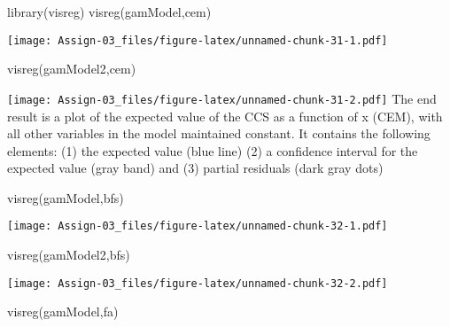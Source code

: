 \documentclass[
]{article}
\newenvironment{Shaded}{\begin{snugshade}}{\end{snugshade}}
\newcommand{\FunctionTok}[1]{\textcolor[rgb]{0.00,0.00,0.00}{#1}}
\newcommand{\NormalTok}[1]{#1}
\newcommand{\StringTok}[1]{\textcolor[rgb]{0.31,0.60,0.02}{#1}}
\begin{document}
\begin{Shaded}
\begin{Highlighting}[]
\FunctionTok{library}\NormalTok{(visreg)}
\FunctionTok{visreg}\NormalTok{(gamModel,}\StringTok{\textquotesingle{}cem\textquotesingle{}}\NormalTok{)}
\end{Highlighting}
\end{Shaded}

\texttt{[image: Assign-03\_files/figure-latex/unnamed-chunk-31-1.pdf]}

\begin{Shaded}
\begin{Highlighting}[]
\FunctionTok{visreg}\NormalTok{(gamModel2,}\StringTok{\textquotesingle{}cem\textquotesingle{}}\NormalTok{) }
\end{Highlighting}
\end{Shaded}

\texttt{[image: Assign-03\_files/figure-latex/unnamed-chunk-31-2.pdf]}
The end result is a plot of the expected value of the CCS as a function
of x (CEM), with all other variables in the model maintained constant.
It contains the following elements: (1) the expected value (blue line)
(2) a confidence interval for the expected value (gray band) and (3)
partial residuals (dark gray dots)

\begin{Shaded}
\begin{Highlighting}[]
\FunctionTok{visreg}\NormalTok{(gamModel,}\StringTok{\textquotesingle{}bfs\textquotesingle{}}\NormalTok{) }
\end{Highlighting}
\end{Shaded}

\texttt{[image: Assign-03\_files/figure-latex/unnamed-chunk-32-1.pdf]}

\begin{Shaded}
\begin{Highlighting}[]
\FunctionTok{visreg}\NormalTok{(gamModel2,}\StringTok{\textquotesingle{}bfs\textquotesingle{}}\NormalTok{) }
\end{Highlighting}
\end{Shaded}

\texttt{[image: Assign-03\_files/figure-latex/unnamed-chunk-32-2.pdf]}

\begin{Shaded}
\begin{Highlighting}[]
\FunctionTok{visreg}\NormalTok{(gamModel,}\StringTok{\textquotesingle{}fa\textquotesingle{}}\NormalTok{) }
\end{Highlighting}
\end{Shaded}
\end{document}
